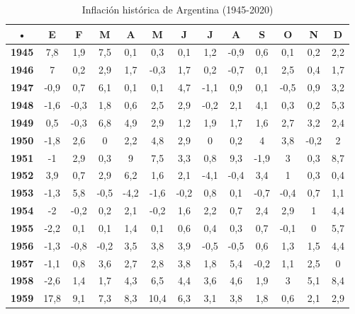 \begin{center}
\begin{scriptsize}
\begin{longtable}{|c|c|c|c|c|c|c|c|c|c|c|c|c|}
\caption{Inflación histórica de Argentina (1945-2020)}
\label{tab:inflacion-arg}\\
\hline 
• & \textbf{E} & \textbf{F} & \textbf{M} & \textbf{A} & \textbf{M} & \textbf{J} & \textbf{J} & \textbf{A} & \textbf{S} & \textbf{O} & \textbf{N} & \textbf{D} \\ 
\hline 
\textbf{1945} & 7,8 & 1,9 & 7,5 & 0,1 & 0,3 & 0,1 & 1,2 & -0,9 & 0,6 & 0,1 & 0,2 & 2,2  \\ 
\hline 
\textbf{1946} & 7 & 0,2 & 2,9 & 1,7 & -0,3 & 1,7 & 0,2 & -0,7 & 0,1 & 2,5 & 0,4 & 1,7  \\ 
\hline 
\textbf{1947} & -0,9 & 0,7 & 6,1 & 0,1 & 0,1 & 4,7 & -1,1 & 0,9 & 0,1 & -0,5 & 0,9 & 3,2  \\ 
\hline 
\textbf{1948} & -1,6 & -0,3 & 1,8 & 0,6 & 2,5 & 2,9 & -0,2 & 2,1 & 4,1 & 0,3 & 0,2 & 5,3  \\ 
\hline 
\textbf{1949} & 0,5 & -0,3 & 6,8 & 4,9 & 2,9 & 1,2 & 1,9 & 1,7 & 1,6 & 2,7 & 3,2 & 2,4  \\ 
\hline 
\textbf{1950} & -1,8 & 2,6 & 0 & 2,2 & 4,8 & 2,9 & 0 & 0,2 & 4 & 3,8 & -0,2 & 2  \\ 
\hline 
\textbf{1951} & -1 & 2,9 & 0,3 & 9 & 7,5 & 3,3 & 0,8 & 9,3 & -1,9 & 3 & 0,3 & 8,7  \\ 
\hline 
\textbf{1952} & 3,9 & 0,7 & 2,9 & 6,2 & 1,6 & 2,1 & -4,1 & -0,4 & 3,4 & 1 & 0,3 & 0,4  \\ 
\hline 
\textbf{1953} & -1,3 & 5,8 & -0,5 & -4,2 & -1,6 & -0,2 & 0,8 & 0,1 & -0,7 & -0,4 & 0,7 & 1,1  \\ 
\hline 
\textbf{1954} & -2 & -0,2 & 0,2 & 2,1 & -0,2 & 1,6 & 2,2 & 0,7 & 2,4 & 2,9 & 1 & 4,4  \\ 
\hline 
\textbf{1955} & -2,2 & 0,1 & 0,1 & 1,4 & 0,1 & 0,6 & 0,4 & 0,3 & 0,7 & -0,1 & 0 & 5,7  \\ 
\hline 
\textbf{1956} & -1,3 & -0,8 & -0,2 & 3,5 & 3,8 & 3,9 & -0,5 & -0,5 & 0,6 & 1,3 & 1,5 & 4,4  \\ 
\hline 
\textbf{1957} & -1,1 & 0,8 & 3,6 & 2,7 & 2,8 & 3,8 & 1,8 & 5,4 & -0,2 & 1,1 & 2,5 & 0  \\ 
\hline 
\textbf{1958} & -2,6 & 1,4 & 1,7 & 4,3 & 6,5 & 4,4 & 3,6 & 4,6 & 1,9 & 3 & 5,1 & 8,4  \\ 
\hline 
\textbf{1959} & 17,8 & 9,1 & 7,3 & 8,3 & 10,4 & 6,3 & 3,1 & 3,8 & 1,8 & 0,6 & 2,1 & 2,9  \\ 

\end{longtable}
\end{scriptsize}
\end{center}
